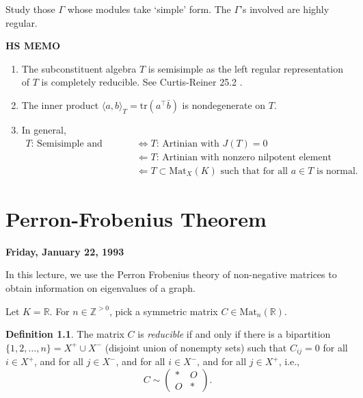 \documentclass[
]{book}
\providecommand{\tightlist}{%
  \setlength{\itemsep}{0pt}\setlength{\parskip}{0pt}}
\theoremstyle{definition}
\newtheorem{definition}{Definition}[chapter]
\theoremstyle{definition}
\theoremstyle{definition}
\theoremstyle{definition}
\theoremstyle{remark}
\begin{document}
Study those \(\Gamma\) whose modules take `simple' form. The \(\Gamma\)'s involved are highly regular.

\leavevmode{}%
\textbf{HS MEMO}

\begin{enumerate}
\def\labelenumi{\arabic{enumi}.}
\tightlist
\item
  The subconstituent algebra \(T\) is semisimple as the left regular representation of \(T\) is completely reducible. See Curtis-Reiner 25.2 \citep{cr}.
\item
  The inner product \(\langle a, b\rangle_T = \mathrm{tr}(a^\top\bar{b})\) is nondegenerate on \(T\).
\item
  In general,
  \begin{align*}
  T\textrm{: Semisimple and Artinian} & \Leftrightarrow T\textrm{: Artinian with } J(T) = 0 \\
  & \Leftarrow T\textrm{: Artinian with nonzero nilpotent element} \\
  & \Leftarrow T \subset \mathrm{Mat}_X(K) \textrm{ such that for all } a\in T \textrm{ is normal.}
  \end{align*}
\end{enumerate}

\hypertarget{lec2}{%
\chapter{Perron-Frobenius Theorem}\label{lec2}}

\textbf{Friday, January 22, 1993}

In this lecture, we use the Perron Frobenius theory of non-negative matrices to obtain information on eigenvalues of a graph.

Let \(K = \mathbb{R}\). For \(n\in \mathbb{Z}^{> 0}\), pick a symmetric matrix \(C\in \mathrm{Mat}_n(\mathbb{R})\).

\begin{definition}
\protect\hypertarget{def:reducible}{}\label{def:reducible}The matrix \(C\) is \emph{reducible} if and only if there is a bipartition \(\{1, 2, \ldots, n\} = X^+ \cup X^-\) (disjoint union of nonempty sets) such that \(C_{ij} = 0\) for all \(i\in X^+\), and for all \(j\in X^-\), and for all \(i\in X^-\), and for all \(j\in X^+\), i.e.,
\[ C \sim \begin{pmatrix} \ast & O \\ O & \ast \end{pmatrix}.\]
\end{definition}
\end{document}
